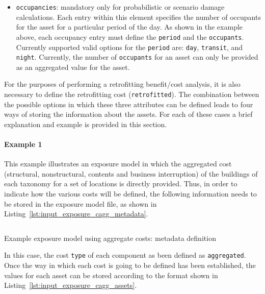\begin{itemize}
  \item \Verb+occupancies+: mandatory only for probabilistic or scenario 
    damage calculations. Each entry within this element specifies the number of
    occupants for the asset for a particular period of the day. As shown in 
    the example above, each occupancy entry must define the \Verb+period+ and 
    the \Verb+occupants+. Currently supported valid options for the 
    \Verb+period+ are: \Verb+day+, \Verb+transit+, and \Verb+night+. Currently,
    the number of \Verb+occupants+ for an asset can only be provided as an 
    aggregated value for the asset.

\end{itemize}

For the purposes of performing a retrofitting benefit/cost analysis, it
is also necessary to define the retrofitting cost (\Verb+retrofitted+). The
combination between the possible options in which these three attributes can
be defined leads to four ways of storing the information about the assets. For
each of these cases a brief explanation and example is provided in this
section.


\paragraph{Example 1}

This example illustrates an \gls{exposure model} in which the aggregated cost
(structural, nonstructural, contents and business interruption) of the
buildings of each taxonomy for a set of locations is directly provided. Thus,
in order to indicate how the various costs will be defined, the following
information needs to be stored in the exposure model file, as shown in
Listing~\ref{lst:input_exposure_cagg_metadata}.

\begin{listing}[htbp]
  \inputminted[firstline=8,firstnumber=8,lastline=18,fontsize=\footnotesize,frame=single,linenos,bgcolor=lightgray]{xml}{oqum/risk/Verbatim/input_exposure_cagg.xml}
  \caption{Example exposure model using aggregate costs: metadata definition}
  \label{lst:input_exposure_cagg_metadata}
\end{listing}

In this case, the cost \Verb+type+ of each component as been defined as
\Verb+aggregated+. Once the way in which each cost is going to be defined has
been established, the values for each asset can be stored according to the
format shown in Listing~\ref{lst:input_exposure_cagg_assets}.

